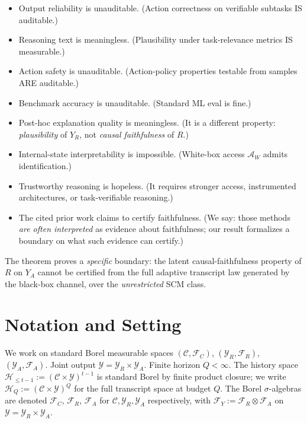 \documentclass{article}
\theoremstyle{plain}
\theoremstyle{definition}
\theoremstyle{remark}
\newcommand{\C}{\mathcal{C}}
\newcommand{\Y}{\mathcal{Y}}
\newcommand{\YR}{\mathcal{Y}_R}
\newcommand{\YA}{\mathcal{Y}_A}
\newcommand{\Hist}{\mathcal{H}}
\begin{document}
\begin{itemize}
  \item Output reliability is unauditable. (Action correctness on verifiable subtasks IS auditable.)
  \item Reasoning text is meaningless. (Plausibility under task-relevance metrics IS measurable.)
  \item Action safety is unauditable. (Action-policy properties testable from samples ARE auditable.)
  \item Benchmark accuracy is unauditable. (Standard ML eval is fine.)
  \item Post-hoc explanation quality is meaningless. (It is a different property: \emph{plausibility} of $Y_R$, not \emph{causal faithfulness} of $R$.)
  \item Internal-state interpretability is impossible. (White-box access $\mathcal{A}_W$ admits identification.)
  \item Trustworthy reasoning is hopeless. (It requires stronger access, instrumented architectures, or task-verifiable reasoning.)
  \item The cited prior work claims to certify faithfulness. (We say: those methods \emph{are often interpreted} as evidence about faithfulness; our result formalizes a boundary on what such evidence can certify.)
\end{itemize}

The theorem proves a \emph{specific} boundary: the latent causal-faithfulness
property of $R$ on $Y_A$ cannot be certified from the full adaptive transcript
law generated by the black-box channel, over the \emph{unrestricted} SCM class.

\section{Notation and Setting}\label{sec:notss}

We work on standard Borel measurable spaces $(\C, \mathcal{F}_C)$,
$(\YR, \mathcal{F}_R)$, $(\YA, \mathcal{F}_A)$. Joint output $\Y = \YR \times \YA$.
Finite horizon $Q < \infty$. The history space
$\Hist_{\le t-1} := (\C \times \Y)^{t-1}$ is standard Borel by finite product
closure; we write $\Hist_Q := (\C \times \Y)^Q$ for the full transcript
space at budget $Q$. The Borel $\sigma$-algebras are denoted $\mathcal F_C$,
$\mathcal F_R$, $\mathcal F_A$ for $\C, \YR, \YA$ respectively, with
$\mathcal F_Y := \mathcal F_R \otimes \mathcal F_A$ on $\Y = \YR \times \YA$.
\end{document}
